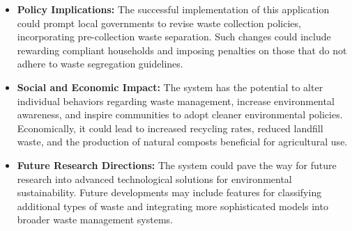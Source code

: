 \begin{itemize}
	\item \textbf{Policy Implications:} The successful implementation of this application could prompt local governments to revise waste collection policies, incorporating pre-collection waste separation. Such changes could include rewarding compliant households and imposing penalties on those that do not adhere to waste segregation guidelines.
	
	\item \textbf{Social and Economic Impact:} The system has the potential to alter individual behaviors regarding waste management, increase environmental awareness, and inspire communities to adopt cleaner environmental policies. Economically, it could lead to increased recycling rates, reduced landfill waste, and the production of natural composts beneficial for agricultural use.
	
	\item \textbf{Future Research Directions:} The system could pave the way for future research into advanced technological solutions for environmental sustainability. Future developments may include features for classifying additional types of waste and integrating more sophisticated models into broader waste management systems.
\end{itemize}
